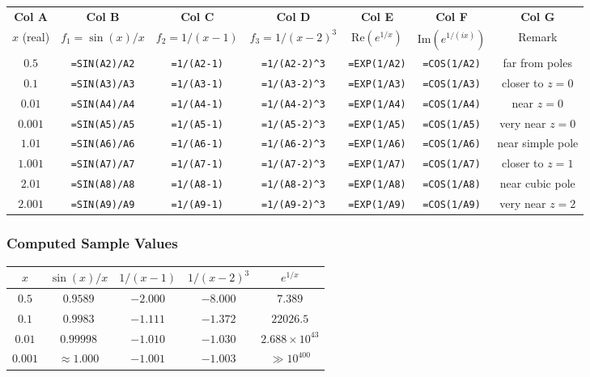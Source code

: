 \documentclass[12pt,a4paper]{article}
\begin{document}
\begin{center}
\renewcommand{\arraystretch}{1.3}
\begin{tabular}{ccccccc}
\toprule
\textbf{Col A} & \textbf{Col B} & \textbf{Col C} & \textbf{Col D} & \textbf{Col E} & \textbf{Col F} & \textbf{Col G} \\
$x$ (real) & $f_1 = \sin(x)/x$ & $f_2 = 1/(x-1)$ & $f_3 = 1/(x-2)^3$ & $\text{Re}(e^{1/x})$ & $\text{Im}(e^{1/(ix)})$ & Remark \\
\midrule
$0.5$   & \texttt{=SIN(A2)/A2}   & \texttt{=1/(A2-1)} & \texttt{=1/(A2-2)\^{}3}  & \texttt{=EXP(1/A2)}    & \texttt{=COS(1/A2)}   & far from poles \\
$0.1$   & \texttt{=SIN(A3)/A3}   & \texttt{=1/(A3-1)} & \texttt{=1/(A3-2)\^{}3}  & \texttt{=EXP(1/A3)}    & \texttt{=COS(1/A3)}   & closer to $z=0$ \\
$0.01$  & \texttt{=SIN(A4)/A4}   & \texttt{=1/(A4-1)} & \texttt{=1/(A4-2)\^{}3}  & \texttt{=EXP(1/A4)}    & \texttt{=COS(1/A4)}   & near $z=0$ \\
$0.001$ & \texttt{=SIN(A5)/A5}   & \texttt{=1/(A5-1)} & \texttt{=1/(A5-2)\^{}3}  & \texttt{=EXP(1/A5)}    & \texttt{=COS(1/A5)}   & very near $z=0$ \\
$1.01$  & \texttt{=SIN(A6)/A6}   & \texttt{=1/(A6-1)} & \texttt{=1/(A6-2)\^{}3}  & \texttt{=EXP(1/A6)}    & \texttt{=COS(1/A6)}   & near simple pole \\
$1.001$ & \texttt{=SIN(A7)/A7}   & \texttt{=1/(A7-1)} & \texttt{=1/(A7-2)\^{}3}  & \texttt{=EXP(1/A7)}    & \texttt{=COS(1/A7)}   & closer to $z=1$ \\
$2.01$  & \texttt{=SIN(A8)/A8}   & \texttt{=1/(A8-1)} & \texttt{=1/(A8-2)\^{}3}  & \texttt{=EXP(1/A8)}    & \texttt{=COS(1/A8)}   & near cubic pole \\
$2.001$ & \texttt{=SIN(A9)/A9}   & \texttt{=1/(A9-1)} & \texttt{=1/(A9-2)\^{}3}  & \texttt{=EXP(1/A9)}    & \texttt{=COS(1/A9)}   & very near $z=2$ \\
\bottomrule
\end{tabular}
\end{center}

\subsubsection*{Computed Sample Values}

\begin{center}
\renewcommand{\arraystretch}{1.3}
\begin{tabular}{ccccc}
\toprule
$x$ & $\sin(x)/x$ & $1/(x-1)$ & $1/(x-2)^3$ & $e^{1/x}$ \\
\midrule
$0.5$   & $0.9589$  & $-2.000$  & $-8.000$    & $7.389$     \\
$0.1$   & $0.9983$  & $-1.111$  & $-1.372$    & $22026.5$   \\
$0.01$  & $0.99998$ & $-1.010$  & $-1.030$    & $2.688\times10^{43}$ \\
$0.001$ & $\approx 1.000$ & $-1.001$ & $-1.003$ & $\gg 10^{400}$ \\
\bottomrule
\end{tabular}
\end{center}
\end{document}
